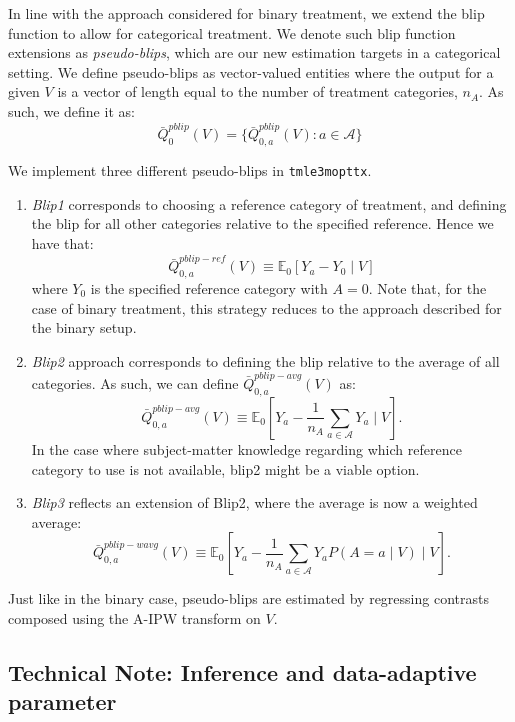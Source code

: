 \documentclass[
  12pt, krantz2,
]{krantz}
\newcommand{\passthrough}[1]{#1}
\newcommand{\E}{\mathbb{E}}
\newcommand{\1}{\mathbbm{1}}
\theoremstyle{definition}
\theoremstyle{definition}
\theoremstyle{definition}
\theoremstyle{definition}
\theoremstyle{remark}
\begin{document}
In line with the approach considered for binary treatment, we extend the blip
function to allow for categorical treatment. We denote such blip function
extensions as \emph{pseudo-blips}, which are our new estimation targets in a
categorical setting. We define pseudo-blips as vector-valued entities where the
output for a given \(V\) is a vector of length equal to the number of treatment
categories, \(n_A\). As such, we define it as:
\[\bar{Q}_0^{pblip}(V) = \{\bar{Q}_{0,a}^{pblip}(V): a \in \mathcal{A} \}\]

We implement three different pseudo-blips in \passthrough{\lstinline!tmle3mopttx!}.

\begin{enumerate}
\def\labelenumi{\arabic{enumi}.}
\item
  \emph{Blip1} corresponds to choosing a reference category of treatment, and
  defining the blip for all other categories relative to the specified
  reference. Hence we have that:
  \[\bar{Q}_{0,a}^{pblip-ref}(V) \equiv \E_0[Y_a-Y_0 \mid V]\] where \(Y_0\) is
  the specified reference category with \(A=0\). Note that, for the case of
  binary treatment, this strategy reduces to the approach described for the
  binary setup.
\item
  \emph{Blip2} approach corresponds to defining the blip relative to the average of
  all categories. As such, we can define \(\bar{Q}_{0,a}^{pblip-avg}(V)\) as:
  \[\bar{Q}_{0,a}^{pblip-avg}(V) \equiv \E_0 [Y_a - \frac{1}{n_A} \sum_{a \in
    \mathcal{A}} Y_a \mid V].\]
  In the case where subject-matter knowledge regarding which reference category
  to use is not available, blip2 might be a viable option.
\item
  \emph{Blip3} reflects an extension of Blip2, where the average is now a weighted
  average:
  \[\bar{Q}_{0,a}^{pblip-wavg}(V) \equiv \E_0 [ Y_a - \frac{1}{n_A} \sum_{a \in
    \mathcal{A}} Y_{a} P(A=a \mid V) \mid V ].\]
\end{enumerate}

Just like in the binary case, pseudo-blips are estimated by regressing contrasts
composed using the A-IPW transform on \(V\).

\hypertarget{technical-note-inference-and-data-adaptive-parameter}{%
\subsection{Technical Note: Inference and data-adaptive parameter}\label{technical-note-inference-and-data-adaptive-parameter}}
\end{document}
